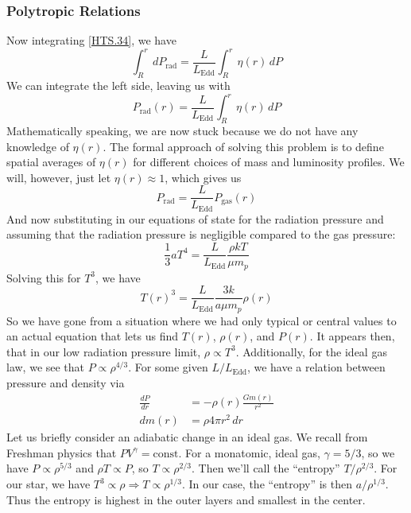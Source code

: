 \documentclass[10pt]{article}
\numberwithin{equation}{section}
\begin{document}
	\subsubsection{Polytropic Relations}
	Now integrating \eqref{HTS.34}, we have
	\begin{equation}
		\label{HTS.35} \int_R^rdP_{\mathrm{rad}}=\frac{L}{L_{\mathrm{Edd}}}
\int_R^r\eta(r)\,dP
	\end{equation}
	We can integrate the left side, leaving us with
	\begin{equation}
		\label{HTS.36} P_{\mathrm{rad}}(r)=\frac{L}{L_{\mathrm{Edd}}}
\int_R^r\eta(r)\,dP
	\end{equation}
	Mathematically speaking, we are now stuck because we do not have any 
knowledge of $\eta(r)$. The formal approach of solving this problem is to 
define spatial averages of $\eta(r)$ for different choices of mass and 
luminosity profiles. We will, however, just let $\eta(r)\approx 1$, which 
gives us
	\begin{equation}
		\label{HTS.37} P_{\mathrm{rad}}=\frac{L}{L_{\mathrm{Edd}}}P_
{\mathrm{gas}}(r)
	\end{equation}
	And now substituting in our equations of state for the radiation 
pressure and assuming that the radiation pressure is negligible compared to 
the gas pressure:
	\begin{equation}
		\label{HTS.38} \frac{1}{3}aT^4=\frac{L}{L_{\mathrm{Edd}}}\frac{\rho 
kT}{\mu m_p}
	\end{equation}
	Solving this for $T^3$, we have
	\begin{equation}
		\label{HTS.39} \boxed{T(r)^3=\frac{L}{L_{\mathrm{Edd}}}\frac{3k}{a
\mu m_p}\rho(r)}
	\end{equation}
	So we have gone from a situation where we had only typical or central 
values to an actual equation that lets us find $T(r)$, $\rho(r)$, and $P(r)
$. It appears then, that in our low radiation pressure limit, $\rho\propto 
T^3$. Additionally, for the ideal gas law, we see that $P\propto \rho^
{4/3}$. For some given $L/L_{\mathrm{Edd}}$, we have a relation between 
pressure and density via
	\begin{align}
		\label{HTS.40} \frac{dP}{dr}&=-\rho(r)\frac{Gm(r)}{r^2}\\
		\label{HTS.41} dm(r) &= \rho 4\pi r^2\,dr
	\end{align}
	Let us briefly consider an adiabatic change in an ideal gas. We recall 
from Freshman physics that $PV^\gamma=\mathrm{const}$. For a monatomic, 
ideal gas, $\gamma=5/3$, so we have $P\propto \rho^{5/3}$ and $\rho T
\propto P$, so $T\propto \rho^{2/3}$. Then we'll call the ``entropy'' $T/
\rho^{2/3}$. For our star, we have $T^3\propto \rho\Rightarrow T\propto 
\rho^{1/3}$. In our case, the ``entropy'' is then $a/\rho^{1/3}$. Thus the 
entropy is highest in the outer layers and smallest in the center.
\end{document}
